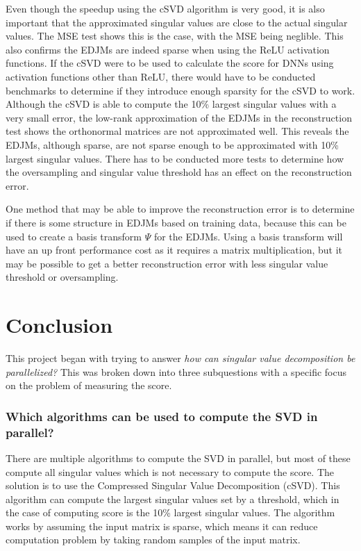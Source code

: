 Even though the speedup using the cSVD algorithm is very good, it is also important that the approximated singular values are close to the actual singular values. The MSE test shows this is the case, with the MSE being neglible. This also confirms the EDJMs are indeed sparse when using the ReLU activation functions. If the cSVD were to be used to calculate the score for DNNs using activation functions other than ReLU, there would have to be conducted benchmarks to determine if they introduce enough sparsity for the cSVD to work. Although the cSVD is able to compute the 10\% largest singular values with a very small error, the low-rank approximation of the EDJMs in the reconstruction test shows the orthonormal matrices are not approximated well. This reveals the EDJMs, although sparse, are not sparse enough to be approximated with 10\% largest singular values. There has to be conducted more tests to determine how the oversampling and singular value threshold has an effect on the reconstruction error.

One method that may be able to improve the reconstruction error is to determine if there is some structure in EDJMs based on training data, because this can be used to create a basis transform $\Psi$ for the EDJMs. Using a basis transform will have an up front performance cost as it requires a matrix multiplication, but it may be possible to get a better reconstruction error with less singular value threshold or oversampling.

\newpage

\section{Conclusion}

This project began with trying to answer \textit{how can singular value decomposition be parallelized?} This was broken down into three subquestions with a specific focus on the problem of measuring the score.

\subsubsection*{Which algorithms can be used to compute the SVD in parallel?}

There are multiple algorithms to compute the SVD in parallel, but most of these compute all singular values which is not necessary to compute the score. The solution is to use the Compressed Singular Value Decomposition (cSVD). This algorithm can compute the largest singular values set by a threshold, which in the case of computing score is the 10\% largest singular values. The algorithm works by assuming the input matrix is sparse, which means it can reduce computation problem by taking random samples of the input matrix.

